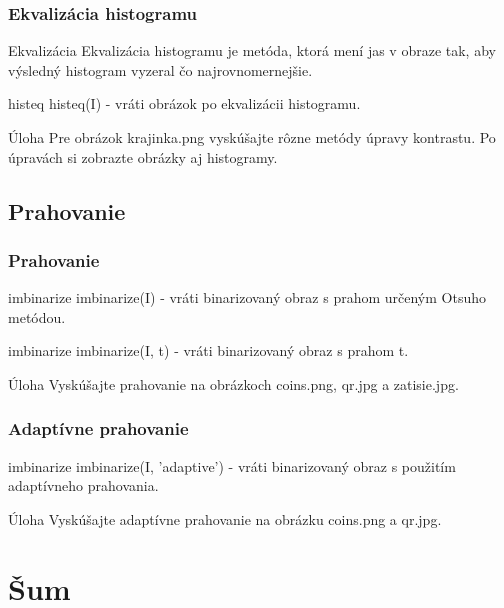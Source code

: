 \documentclass{beamer}
\begin{document}
\begin{frame}
\frametitle{Ekvalizácia histogramu}
\begin{block}{Ekvalizácia}
Ekvalizácia histogramu je metóda, ktorá mení jas v obraze tak, aby výsledný histogram vyzeral čo najrovnomernejšie.
\end{block}

\begin{block}{histeq}
histeq(I) - vráti obrázok po ekvalizácii histogramu.
\end{block}

\begin{block}{Úloha}
Pre obrázok krajinka.png vyskúšajte rôzne metódy úpravy kontrastu. Po úpravách si zobrazte obrázky aj histogramy.
\end{block}
\end{frame}

\subsection{Prahovanie}
\begin{frame}
\frametitle{Prahovanie}
\begin{block}{imbinarize}
imbinarize(I) - vráti binarizovaný obraz s prahom určeným Otsuho metódou.
\end{block}

\begin{block}{imbinarize}
imbinarize(I, t) - vráti binarizovaný obraz s prahom t.
\end{block}

\begin{block}{Úloha}
Vyskúšajte prahovanie na obrázkoch coins.png, qr.jpg a zatisie.jpg.
\end{block}
\end{frame}

\begin{frame}
\frametitle{Adaptívne prahovanie}
\begin{block}{imbinarize}
imbinarize(I, 'adaptive') - vráti binarizovaný obraz s použitím adaptívneho prahovania.
\end{block}

\begin{block}{Úloha}
Vyskúšajte adaptívne prahovanie na obrázku coins.png a qr.jpg.
\end{block}
\end{frame}

\section{Šum}
\end{document}
